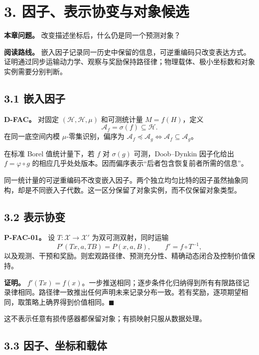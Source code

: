\documentclass[
  11pt,
  oneside]{book}
\begin{document}
\chapter{3. 因子、表示协变与对象候选}\label{ch-3}

\textbf{本章问题。} 改变描述坐标后，什么仍是同一个预测对象？

\textbf{阅读路线。} 嵌入因子记录同一历史中保留的信息，可逆重编码只改变表达方式。证明通过同步运输动力学、观察与奖励保持路径律；物理载体、极小坐标数和对象实例需要分别判断。

\section{3.1 嵌入因子}\label{ux5d4cux5165ux56e0ux5b50}

\textbf{D-FAC。} 对固定 \((\mathcal H,\mathscr H,\mu)\) 和可测统计量 \(M=f(H)\)，定义 \[\mathscr A_f=\sigma(f)\subseteq\mathscr H.\] 在同一底空间内模 \(\mu\)-零集识别，偏序为 \(\mathscr A_f\preceq\mathscr A_g\iff\mathscr A_f\subseteq\mathscr A_g\)。

在标准 Borel 值统计量下，若 \(f\) 对 \(\sigma(g)\) 可测，Doob--Dynkin 因子化给出 \(f=\varphi\circ g\) 的相应几乎处处版本。因而偏序表示``后者包含恢复前者所需的信息''。

同一统计量的可逆重编码不改变嵌入因子。两个独立均匀比特的因子虽然抽象同构，却是不同嵌入子代数。这一区分保留了对象实例，而不仅保留对象类型。

\section{3.2 表示协变}\label{ux8868ux793aux534fux53d8}

\hypertarget{p-fac-01}{}\label{p-fac-01}

\textbf{P-FAC-01。} 设 \(T:\mathcal X\to\mathcal X'\) 为双可测双射，同时运输 \[P'(Tx,a,T B)=P(x,a,B),\qquad f'=f\circ T^{-1},\] 以及观测、干预和奖励。则宏观路径律、预测充分性、精确动态闭合及控制价值保持。

\textbf{证明。} \(f'(Tx)=f(x)\)。一步推送相同；逐步条件化归纳得到所有有限路径记录律相同。路径律一致推出任何声明未来记录分布一致。若有奖励，逐项期望相同，取策略上确界得到价值相同。\(\blacksquare\)

这不表示任意有损传感器都保留对象；有损映射只服从数据处理。

\section{3.3 因子、坐标和载体}\label{ux56e0ux5b50ux5750ux6807ux548cux8f7dux4f53}
\end{document}
